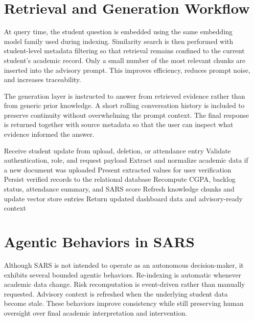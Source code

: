 
\section{Retrieval and Generation Workflow}
At query time, the student question is embedded using the same embedding model family used during indexing. Similarity search is then performed with student-level metadata filtering so that retrieval remains confined to the current student's academic record. Only a small number of the most relevant chunks are inserted into the advisory prompt. This improves efficiency, reduces prompt noise, and increases traceability.

The generation layer is instructed to answer from retrieved evidence rather than from generic prior knowledge. A short rolling conversation history is included to preserve continuity without overwhelming the prompt context. The final response is returned together with source metadata so that the user can inspect what evidence informed the answer.

\begin{algorithm}[H]
\caption{SARS Recompute and Advisory Refresh Workflow}
\begin{algorithmic}[1]
\STATE Receive student update from upload, deletion, or attendance entry
\STATE Validate authentication, role, and request payload
\STATE Extract and normalize academic data if a new document was uploaded
\STATE Present extracted values for user verification
\STATE Persist verified records to the relational database
\STATE Recompute CGPA, backlog status, attendance summary, and SARS score
\STATE Refresh knowledge chunks and update vector store entries
\STATE Return updated dashboard data and advisory-ready context
\end{algorithmic}
\end{algorithm}

\section{Agentic Behaviors in SARS}
Although SARS is not intended to operate as an autonomous decision-maker, it exhibits several bounded agentic behaviors. Re-indexing is automatic whenever academic data change. Risk recomputation is event-driven rather than manually requested. Advisory context is refreshed when the underlying student data become stale. These behaviors improve consistency while still preserving human oversight over final academic interpretation and intervention.

